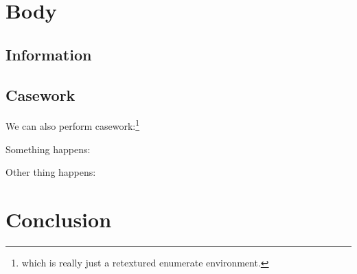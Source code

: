 \documentclass{article}
\begin{document}
\section{Body}

\subsection{Information}
\lipsum[49-52]

\subsection{Casework}
We can also perform casework:\footnote{which is really just a retextured enumerate environment.}
\begin{casework}
    \item Something happens: \lipsum[6-6]
    \item Other thing happens: \lipsum[5-5]
\end{casework}

\section{Conclusion}
\lipsum[7-7]
\end{document}
